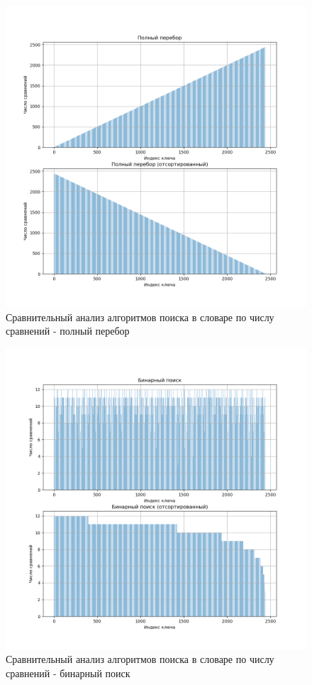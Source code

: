 \begin{figure}[H]
	\begin{center}
		\includegraphics[scale=0.5]{img/brute_cmprs.png}
	\end{center}
	\captionsetup{justification=centering}
	\caption{Сравнительный анализ алгоритмов поиска в словаре по числу сравнений - полный перебор}
	\label{img:brute-cmprs}
\end{figure}

\begin{figure}[H]
	\begin{center}
		\includegraphics[scale=0.5]{img/binary_cmprs.png}
	\end{center}
	\captionsetup{justification=centering}
	\caption{Сравнительный анализ алгоритмов поиска в словаре по числу сравнений - бинарный поиск}
	\label{img:binary-cmprs}
\end{figure}

